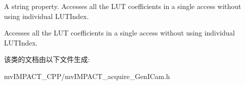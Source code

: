 A string property. Accesses all the L\+U\+T coefficients in a single access without using individual L\+U\+T\+Index. 

Accesses all the L\+U\+T coefficients in a single access without using individual L\+U\+T\+Index. 

该类的文档由以下文件生成\+:\begin{DoxyCompactItemize}
\item 
mv\+I\+M\+P\+A\+C\+T\+\_\+\+C\+P\+P/mv\+I\+M\+P\+A\+C\+T\+\_\+acquire\+\_\+\+Gen\+I\+Cam.\+h\end{DoxyCompactItemize}
